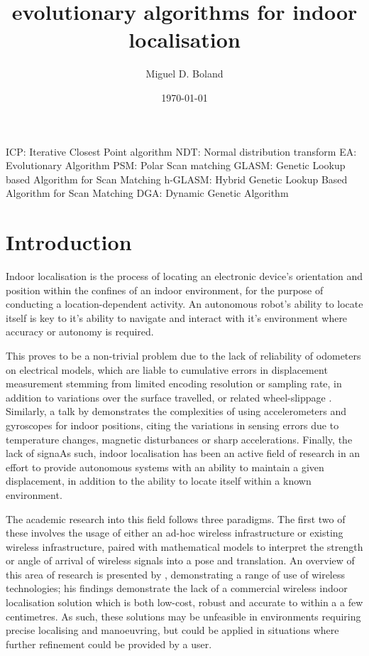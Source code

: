 \documentclass[authoryearcitations]{UoYCSproject}
\author{Miguel D. Boland}
\title{evolutionary algorithms for indoor localisation}
\date{\today}
\begin{document}
\maketitle
\listoffigures
\listoftables
ICP: Iterative Closest Point algorithm
NDT: Normal distribution transform
EA: Evolutionary Algorithm
PSM: Polar Scan matching
GLASM: Genetic Lookup based Algorithm for Scan Matching
h-GLASM: Hybrid Genetic Lookup Based Algorithm for Scan Matching
DGA: Dynamic Genetic Algorithm


\chapter{Introduction}
\label{cha:Introduction}
Indoor localisation is the process of locating an electronic device's orientation and position within the confines of an indoor environment, for the purpose of conducting a location-dependent activity. An autonomous robot's ability to locate itself is key to it's ability to navigate and interact with it's environment where accuracy or autonomy is required. 

This proves to be a non-trivial problem due to the lack of reliability of odometers on electrical models, which are liable to cumulative errors in displacement measurement stemming from limited encoding resolution or sampling rate, in addition to variations over the surface travelled, or related wheel-slippage \cite{Borenstein1996-al}. Similarly, a talk by \citet{Sachs2010-pw} demonstrates the complexities of using accelerometers and gyroscopes for indoor positions, citing the variations in sensing errors due to temperature changes, magnetic disturbances or sharp accelerations. Finally, the lack of signaAs such, indoor localisation has been an active field of research in an effort to provide autonomous systems with an ability to maintain a given displacement, in addition to the ability to locate itself within a known environment. 

The academic research into this field follows three paradigms. The first two of these involves the usage of either an ad-hoc wireless infrastructure or existing wireless infrastructure, paired with mathematical models to interpret the strength or angle of arrival of wireless signals into a pose and translation. An overview of this area of research is presented by \citet{Liu2007-in}, demonstrating a range of use of wireless technologies; his findings demonstrate the lack of a commercial wireless indoor localisation solution which is both low-cost, robust and accurate to within a a few centimetres. As such, these solutions may be unfeasible in environments requiring precise localising and manoeuvring, but could be applied in situations where further refinement could be provided by a user.
\end{document}
